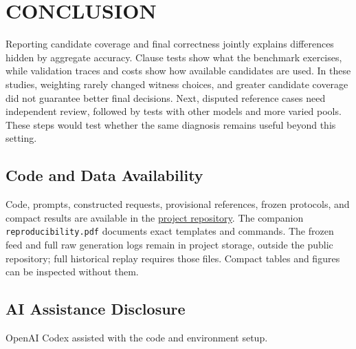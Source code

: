 \documentclass[a4paper,twoside]{article}
\begin{document}
\section{\uppercase{Conclusion}}
\label{sec:conclusion}

\noindent Reporting candidate coverage and final correctness jointly explains differences hidden by aggregate accuracy. Clause tests show what the benchmark exercises, while validation traces and costs show how available candidates are used. In these studies, weighting rarely changed witness choices, and greater candidate coverage did not guarantee better final decisions. Next, disputed reference cases need independent review, followed by tests with other models and more varied pools. These steps would test whether the same diagnosis remains useful beyond this setting.


\subsection*{Code and Data Availability}
\label{sec:availability}
Code, prompts, constructed requests, provisional references, frozen protocols, and compact results are available in the \href{https://github.com/mantzaris/LLMplanningContraintsDecision}{project repository}. The companion \texttt{reproducibility.pdf} documents exact templates and commands. The frozen feed and full raw generation logs remain in project storage, outside the public repository; full historical replay requires those files. Compact tables and figures can be inspected without them.

\subsection*{AI Assistance Disclosure}
\label{sec:ai}
OpenAI Codex \cite{codex} assisted with the code and environment setup.
\end{document}
